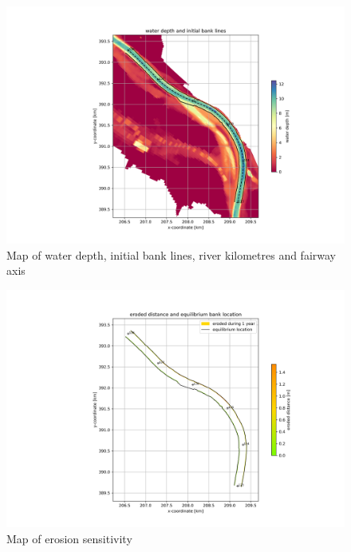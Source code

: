 \clearpage
\begin{figure}
\includegraphics[width=\textwidth]{figures/1_banklines.png}
\caption{Map of water depth, initial bank lines, river kilometres and fairway axis}
\label{Fig2.4}
\end{figure}

\begin{figure}
\includegraphics[width=\textwidth]{figures/2_erosion_sensitivity.png}
\caption{Map of erosion sensitivity}
\label{Fig2.5}
\end{figure}

